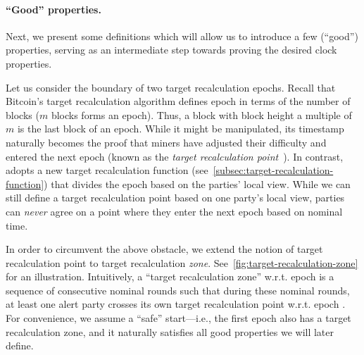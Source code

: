 \paragraph{``Good'' properties.}
%
Next, we present some definitions which will allow us to introduce a few (``good'') properties, serving as an intermediate step towards proving the desired clock properties.

Let us consider the boundary of two target recalculation epochs.
%
Recall that Bitcoin's target recalculation algorithm defines epoch in terms of the number of blocks ($m$ blocks forms an epoch).
%
Thus, a block with block height a multiple of $m$ is the last block of an epoch.
%
While it might be manipulated, its timestamp naturally becomes the proof that miners have adjusted their difficulty and entered the next epoch (known as the \emph{target recalculation point}~\cite{C:GarKiaLeo17}).
%
In contrast, \timekeeper adopts a new target recalculation function (see~\cref{subsec:target-recalculation-function}) that divides the epoch based on the parties' local view.
%
While we can still define a target recalculation point based on one party's local view, parties can \emph{never} agree on a point where they enter the next epoch based on nominal time.

In order to circumvent the above obstacle, we extend the notion of target recalculation point to target recalculation \emph{zone}.
%
See~\cref{fig:target-recalculation-zone} for an illustration.
%
Intuitively, a ``target recalculation zone'' w.r.t. epoch \epoch is a sequence of consecutive nominal rounds such that during these nominal rounds, at least one alert party crosses its own target recalculation point w.r.t. epoch \epoch.
%
For convenience, we assume a ``safe'' start---i.e., the first epoch also has a target recalculation zone, and it naturally satisfies all good properties we will later define.




